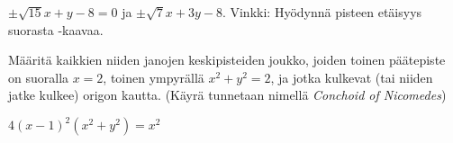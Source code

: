 \begin{tehtavasivu}
\begin{tehtava}
\begin{vastaus}
$\pm\sqrt{15}x+y-8= 0$ ja $\pm\sqrt{7}x+3y-8$. Vinkki: Hyödynnä pisteen etäisyys suorasta -kaavaa.
\end{vastaus}
\end{tehtava}

\begin{tehtava}
Määritä kaikkien niiden janojen keskipisteiden joukko, joiden toinen päätepiste on suoralla $x = 2$, toinen ympyrällä $x^2+y^2 = 2$, ja jotka kulkevat (tai niiden jatke kulkee) origon kautta. (Käyrä tunnetaan nimellä \textit{Conchoid of Nicomedes})
	\begin{vastaus}
		$4(x-1)^2(x^2+y^2) = x^2$
	\end{vastaus}
	
\end{tehtava}


\end{tehtavasivu}